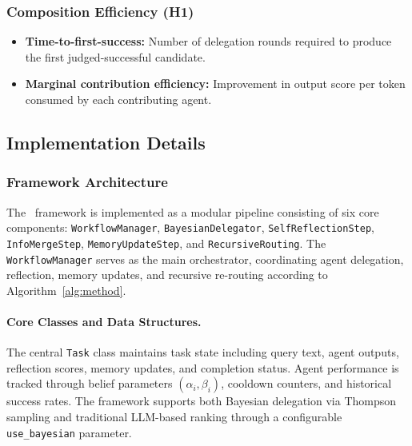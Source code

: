 \subsubsection{Composition Efficiency (H1)}
\begin{itemize}
    \item \textbf{Time-to-first-success:} Number of delegation rounds required to produce the first judged-successful candidate.
    \item \textbf{Marginal contribution efficiency:} Improvement in output score per token consumed by each contributing agent.
\end{itemize}

 \subsection{Implementation Details}

  \subsubsection{Framework Architecture}
  The \method\ framework is implemented as a modular pipeline consisting of six core components: \texttt{WorkflowManager}, \texttt{BayesianDelegator}, \texttt{SelfReflectionStep}, \texttt{InfoMergeStep}, \texttt{MemoryUpdateStep}, and \texttt{RecursiveRouting}. The
  \texttt{WorkflowManager} serves as the main orchestrator, coordinating agent delegation, reflection, memory updates, and recursive re-routing according to Algorithm~\ref{alg:method}.

  \paragraph{Core Classes and Data Structures.}
  The central \texttt{Task} class maintains task state including query text, agent outputs, reflection scores, memory updates, and completion status. Agent performance is tracked through belief parameters $(\alpha_i, \beta_i)$, cooldown counters, and historical success rates. The
  framework supports both Bayesian delegation via Thompson sampling and traditional LLM-based ranking through a configurable \texttt{use\_bayesian} parameter.

